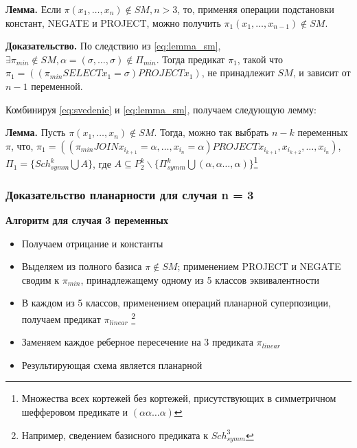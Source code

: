 \documentclass[12pt]{article}
\begin{document}
\label{eq:svedenie}
\textbf{Лемма.} Если $\pi(x_1, \dots, x_n) \notin SM, n > 3$, то, применяя операции подстановки констант, NEGATE и PROJECT,
можно получить $\pi_1(x_1, \dots, x_{n-1}) \notin SM$.

\textbf{Доказательство.} По следствию из \ref{eq:lemma_sm}, 
$\exists \pi_{min} \notin SM, \alpha=(\sigma, \dots, \sigma) \notin \Pi_{min}$. Тогда предикат $\pi_1$, такой что
$\pi_1 = ( (\pi_{min} SELECT x_1=\sigma) PROJECT x_1 )$, не принадлежит $SM$, и зависит от $n-1$ переменной.


Комбинируя \ref{eq:svedenie} и \ref{eq:lemma_sm}, получаем следующую лемму:

\label{eq:main_lemma}
\textbf{Лемма.} Пусть $\pi(x_1, \dots, x_n) \notin SM$. Тогда, можно так выбрать $n-k$ переменных $\pi$, что,
$\pi_1 = ((\pi_{min} JOIN x_{i_{k+1}}=\alpha, \dots, x_{i_n}=\alpha) PROJECT x_{i_{k+1}}, x_{i_{k+2}}, \dots, x_{i_n})$,
$\Pi_1 = \{ Sch_{symm}^k \bigcup A \}$, где 
$A \subseteq P_2^k \backslash \{\Pi_{symm}^k \bigcup (\alpha, \alpha \dots, \alpha)\}$\footnote{
Множества всех кортежей без кортежей, присутствующих в симметричном шефферовом предикате и $(\alpha\alpha\dots\alpha)$}

\subsubsection{Доказательство планарности для случая n = 3}

\textbf{Алгоритм для случая 3 переменных}
\begin{itemize}
\item{Получаем отрицание и константы}
\item{Выделяем из полного базиса $\pi \notin SM$; применением PROJECT и NEGATE сводим к $\pi_{min}$,
 принадлежащему одному из 5 классов эквивалентности}
\item{В каждом из 5 классов, применением операций планарной суперпозиции, получаем предикат $\pi_{linear}$
\footnote{Например, сведением базисного предиката к $Sch_{symm}^3$}}
\item{Заменяем каждое реберное пересечение на 3 предиката $\pi_{linear}$}
\item{Результирующая схема является планарной}
\end{itemize}
\end{document}
